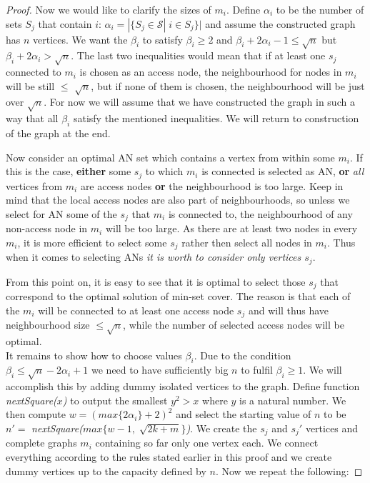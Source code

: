 \begin{proof}
			\noindent Now we would like to clarify the sizes of $m_{i}$. Define $\alpha_{i}$ to be the number of sets $S_{j}$ that contain $i$: $\alpha_{i} = |\{S_{j} \in \mathcal{S}| \; i \in S_{j}\}|$ and assume the constructed graph has $n$ vertices. We want the $\beta_{i}$ to satisfy $\beta_{i} \geq 2$ and $\beta_{i} + 2\alpha_{i} - 1 \leq \sqrt{n}$ but $\beta_{i} + 2\alpha_{i} > \sqrt{n}$. The last two inequalities would mean that if at least one $s_{j}$ connected to $m_{i}$ is chosen as an access node, the neighbourhood for nodes in $m_{i}$ will be still $\leq$ $\sqrt{n}$, but if none of them is chosen, the neighbourhood will be just over $\sqrt{n}$. For now we will assume that we have constructed the graph in such a way that all $\beta_{i}$ satisfy the mentioned inequalities. We will return to construction of the graph at the end.
			
			Now consider an optimal AN set which contains a vertex from within some $m_{i}$. If this is the case, \textbf{either} some $s_{j}$ to which $m_{i}$ is connected is selected as AN, \textbf{or} \textit{all} vertices from $m_{i}$ are access nodes \textbf{or} the neighbourhood is too large. Keep in mind that the local access nodes are also part of neighbourhoods, so unless we select for AN some of the $s_{j}$ that $m_{i}$ is connected to, the neighbourhood of any non-access node in $m_{i}$ will be too large. As there are at least two nodes in every $m_{i}$, it is more efficient to select some $s_{j}$ rather then select all nodes in $m_{i}$. Thus when it comes to selecting ANs \textit{it is worth to consider only vertices $s_{j}$}.
			
			From this point on, it is easy to see that it is optimal to select those $s_{j}$ that correspond to the optimal solution of min-set cover. The reason is that each of the $m_{i}$ will be connected to at least one access node $s_{j}$ and will thus have neighbourhood size $\leq \sqrt{n}$, while the number of selected access nodes will be optimal. \\
			
			\noindent It remains to show how to choose values $\beta_{i}$. Due to the condition $\beta_{i} \leq \sqrt{n} - 2\alpha_{i} + 1$ we need to have sufficiently big $n$ to fulfil $\beta_{i} \geq 1$. We will accomplish this by adding dummy isolated vertices to the graph. Define function \textit{nextSquare($x$)} to output the smallest $y^{2} > x$ where $y$ is a natural number. We then compute $w = (max\{2\alpha_{i}\} + 2)^{2}$ and select the starting value of $n$ to be $n' =$ \textit{nextSquare($max\{w - 1, \; \sqrt{2k + m}\}$)}. We create the $s_{j}$ and $s_{j}'$ vertices and complete graphs $m_{i}$ containing so far only one vertex each. We connect everything according to the rules stated earlier in this proof and we create dummy vertices up to the capacity defined by $n$. Now we repeat the following:
			

\end{proof}
